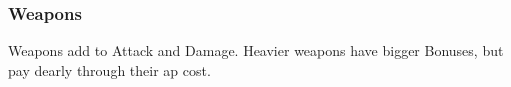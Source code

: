 \subsubsection{Weapons}

Weapons add to Attack and Damage.
Heavier weapons have bigger Bonuses, but pay dearly through their \gls{ap} cost.

